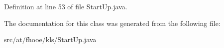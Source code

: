 Definition at line 53 of file Start\-Up.\-java.



The documentation for this class was generated from the following file\-:\begin{DoxyCompactItemize}
\item 
src/at/fhooe/kls/Start\-Up.\-java\end{DoxyCompactItemize}
